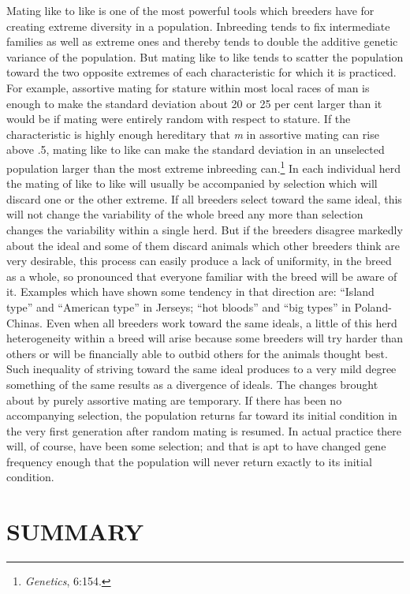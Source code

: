 Mating like to like is one of the most powerful tools which breeders
have for creating extreme diversity in a population. Inbreeding tends
to fix intermediate families as well as extreme ones and thereby tends
to double the additive genetic variance of the population. But mating
like to like tends to scatter the population toward the two opposite
extremes of each characteristic for which it is practiced. For example,
assortive mating for stature within most local races of man is enough to
make the standard deviation about 20 or 25 per cent larger than it
would be if mating were entirely random with respect to stature. If the
characteristic is highly enough hereditary that \textit{m} in assortive
mating can rise above .5, mating like to like can make the standard
deviation in an unselected population larger than the most extreme
inbreeding can.\footnote{\textit{Genetics}, 6:154.} In each individual
herd the mating of like to like will usually be accompanied by selection
which will discard one or the other extreme. If all breeders select
toward the same ideal, this will not change the variability
of the whole breed any more than selection changes the variability
within a single herd. But if the breeders disagree markedly about the
ideal and some of them discard animals which other breeders think are
very desirable, this process can easily produce a lack of uniformity, in
the breed as a whole, so pronounced that everyone familiar with the
breed will be aware of it. Examples which have shown some tendency in
that direction are: ``Island type'' and ``American type'' in Jerseys;
``hot bloods'' and ``big types'' in Poland-Chinas. Even when all breeders
work toward the same ideals, a little of this herd heterogeneity within a
breed will arise because some breeders will try harder than others or
will be financially able to outbid others for the animals thought best.
Such inequality of striving toward the same ideal produces to a very
mild degree something of the same results as a divergence of ideals.
The changes brought about by purely assortive mating are temporary.
If there has been no accompanying selection, the population
returns far toward its initial condition in the very first generation after
random mating is resumed. In actual practice there will, of course, have
been some selection; and that is apt to have changed gene frequency
enough that the population will never return exactly to its initial
condition.

\section*{SUMMARY}

